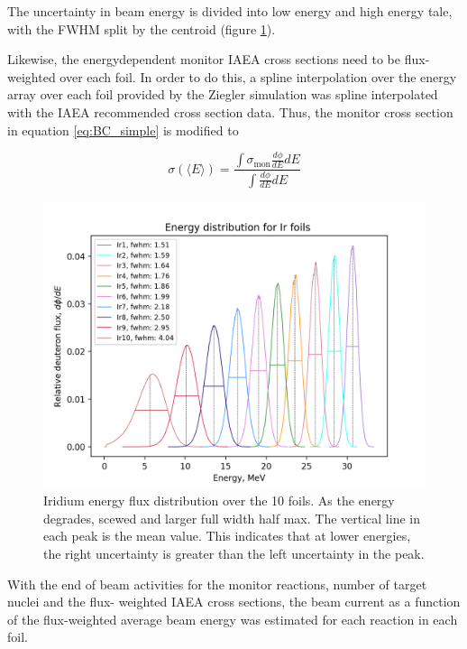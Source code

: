 The uncertainty in beam energy is divided into low energy and high energy tale, with the FWHM split by the centroid (figure \ref{fig:ir_energyflux}). 

Likewise, the energydependent monitor IAEA cross sections need to be flux-weighted over each foil. In order to do this, a spline interpolation over the energy array over each foil provided by the Ziegler simulation was spline interpolated with the IAEA recommended cross section data. Thus, the monitor cross section in equation \ref{eq:BC_simple} is modified to 

\begin{equation}
    \sigma (\langle E\rangle) = \frac{\int \sigma_\text{mon} \frac{d\phi}{dE}dE}{\int \frac{d\phi}{dE}dE}
\end{equation}


\begin{figure}
    \centering
    \includegraphics{Analysis/Ir_flux_distribution_B_+2_D_+4,25.png}
    \caption{Iridium energy flux distribution over the 10 foils. As the energy degrades, scewed and larger full width half max. The vertical line in each peak is the mean value. This indicates that at lower energies, the right uncertainty is greater than the left uncertainty in the peak.}
    \label{fig:ir_energyflux}
\end{figure}

With the end of beam activities for the monitor reactions, number of target nuclei and the flux- weighted IAEA cross sections, the beam current as a function of the flux-weighted average beam energy was estimated for each reaction in each foil. 

